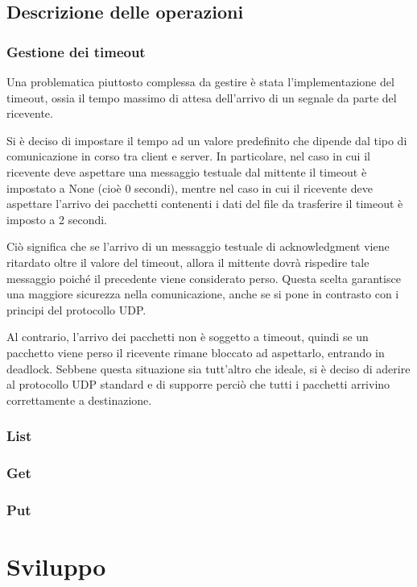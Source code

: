 \documentclass[a4paper,12pt]{report}
\begin{document}
\section{Descrizione delle operazioni}

\subsection{Gestione dei timeout}
Una problematica piuttosto complessa da gestire è stata l'implementazione del timeout, ossia il tempo massimo di attesa dell'arrivo di un segnale da parte del ricevente. 

Si è deciso di impostare il tempo ad un valore predefinito che dipende dal tipo di comunicazione in corso tra client e server.
In particolare, nel caso in cui il ricevente deve aspettare una messaggio testuale dal mittente il timeout è impostato a None (cioè 0 secondi), mentre nel caso in cui il ricevente deve aspettare l'arrivo dei pacchetti contenenti i dati del file da trasferire il timeout è imposto a 2 secondi.

Ciò significa che se l'arrivo di un messaggio testuale di acknowledgment viene ritardato oltre il valore del timeout, allora il mittente dovrà rispedire tale messaggio poiché il precedente viene considerato perso. Questa scelta garantisce una maggiore sicurezza nella comunicazione, anche se si pone in contrasto con i principi del protocollo UDP. 

Al contrario, l'arrivo dei pacchetti non è soggetto a timeout, quindi se un pacchetto viene perso il ricevente rimane bloccato ad aspettarlo, entrando in deadlock. Sebbene questa situazione sia tutt'altro che ideale, si è deciso di aderire al protocollo UDP standard e di supporre perciò che tutti i pacchetti arrivino correttamente a destinazione.

\subsection{List}

\subsection{Get}

\subsection{Put}


\chapter{Sviluppo}
\end{document}
